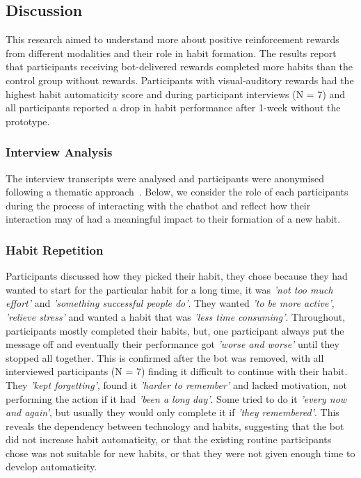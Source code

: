 \subsection{Discussion}
This research aimed to understand more about positive reinforcement rewards from different modalities and their role in habit formation. The results report that participants receiving bot-delivered rewards completed more habits than the control group without rewards. Participants with visual-auditory rewards had the highest habit automaticity score and during participant interviews (N = 7) and all participants reported a drop in habit performance after 1-week without the prototype.

\subsubsection{Interview Analysis}
The interview transcripts were analysed and participants were anonymised following a thematic approach~\cite{thematic_analysis_qualatitive_data}. Below, we consider the role of each participants during the process of interacting with the chatbot and reflect how their interaction may of had a meaningful impact to their formation of a new habit.

\subsubsection*{Habit Repetition}
Participants discussed how they picked their habit, they chose because they had wanted to start for the particular habit for a long time, it was \textit{'not too much effort'} and \textit{'something successful people do'}. They wanted \textit{'to be more active'}, \textit{'relieve stress'} and wanted a habit that was \textit{'less time consuming'}. Throughout, participants mostly completed their habits, but, one participant always put the message off and eventually their performance got \textit{'worse and worse'} until they stopped all together. This is confirmed after the bot was removed, with all interviewed participants (N = 7) finding it difficult to continue with their habit. They \textit{'kept forgetting'}, found it \textit{'harder to remember'} and lacked motivation, not performing the action if it had \textit{'been a long day'}. Some tried to do it \textit{'every now and again'}, but usually they would only complete it if \textit{'they remembered'}. This reveals the dependency between technology and habits, suggesting that the bot did not increase habit automaticity, or that the existing routine participants chose was not suitable for new habits, or that they were not given enough time to develop automaticity.

